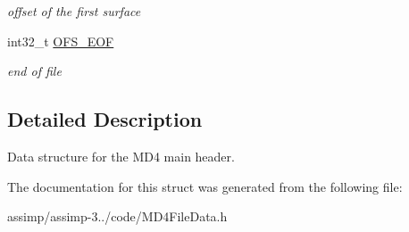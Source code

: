 \begin{DoxyCompactItemize}
\begin{DoxyCompactList}\small\item\em offset of the first surface \end{DoxyCompactList}\item 
\hypertarget{struct_assimp_1_1_m_d4_1_1_header_ae60e2fef7fff9fc81e3bd3921afa26c4}{int32\+\_\+t \hyperlink{struct_assimp_1_1_m_d4_1_1_header_ae60e2fef7fff9fc81e3bd3921afa26c4}{O\+F\+S\+\_\+\+E\+O\+F}}\label{struct_assimp_1_1_m_d4_1_1_header_ae60e2fef7fff9fc81e3bd3921afa26c4}

\begin{DoxyCompactList}\small\item\em end of file \end{DoxyCompactList}\end{DoxyCompactItemize}


\subsection{Detailed Description}
Data structure for the M\+D4 main header. 

The documentation for this struct was generated from the following file\+:\begin{DoxyCompactItemize}
\item 
assimp/assimp-\/3../code/M\+D4\+File\+Data.\+h\end{DoxyCompactItemize}
